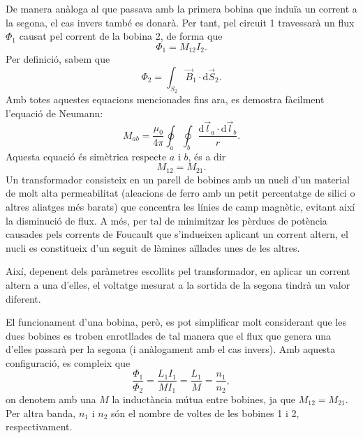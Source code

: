 \documentclass[a4paper,10.5pt]{report}
\begin{document}
De manera anàloga al que passava amb la primera bobina que induïa un corrent a la segona, el cas invers també es donarà. Per tant, pel circuit 1 travessarà un flux $\Phi_1$ causat pel corrent de la bobina 2, de forma que
\begin{equation}
	\Phi_1=M_{12}I_2 \label{eq:4:4}.
\end{equation}
Per definició, sabem que
\begin{equation}
	\Phi_2=\int_{S_2}\vec{B}_1 \cdot \mathrm{d}\Vec{S}_2 \label{eq:4:5}.
\end{equation}
Amb totes aquestes equacions mencionades fins ara, es demostra fàcilment l'equació de Neumann:
\begin{equation}
	M_{ab}=\frac{\mu_0}{4\pi}\oint_a\oint_b\frac{\mathrm{d}\Vec{l}_a\cdot\mathrm{d}\Vec{l}_b}{r} \label{eq:4:6}.
\end{equation}
Aquesta equació és simètrica respecte $a$ i $b$, és a dir
\begin{equation}
	M_{12}=M_{21}. \label{eq:4:7}
\end{equation}
Un transformador consisteix en un parell de bobines amb un nucli d'un material de molt alta permeabilitat (aleacions de ferro amb un petit percentatge de silici o altres aliatges més barats) que concentra les línies de camp magnètic, evitant així la disminució de flux. A més, per tal de minimitzar les pèrdues de potència causades pels corrents de Foucault que s'indueixen aplicant un corrent altern, el nucli es constitueix d'un seguit de làmines aïllades unes de les altres. 

Així, depenent dels paràmetres escollits pel transformador, en aplicar un corrent altern a una d'elles, el voltatge mesurat a la sortida de la segona tindrà un valor diferent.

El funcionament d'una bobina, però, es pot simplificar molt considerant que les dues bobines es troben enrotllades de tal manera que el flux que genera una d'elles passarà per la segona (i anàlogament amb el cas invers). Amb aquesta configuració, es compleix que
\begin{equation}
	\frac{\Phi_1}{\Phi_2}=\frac{L_1I_1}{MI_1}=\frac{L_1}{M}=\frac{n_1}{n_2}, \label{eq:4:8}
\end{equation}
on denotem amb una $M$ la inductància mútua entre bobines, ja que $M_{12}=M_{21}$. Per altra banda, $n_1$ i $n_2$ són el nombre de voltes de les bobines 1 i 2, respectivament.
\end{document}
